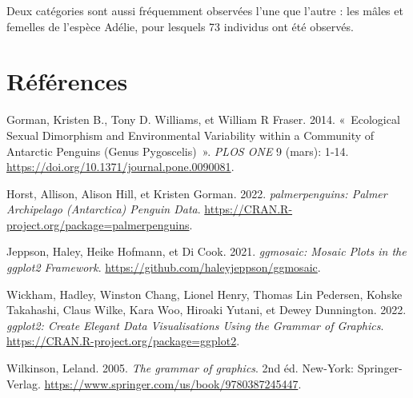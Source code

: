\documentclass[
  letterpaper,
  DIV=11,
  numbers=noendperiod]{scrreprt}
\newlength{\cslhangindent}
\newlength{\cslentryspacingunit} %
\newenvironment{CSLReferences}[2] %
 {%
  \setlength{\parindent}{0pt}
  \ifodd #1
  \let\oldpar\par
  \def\par{\hangindent=\cslhangindent\oldpar}
  \fi
  \setlength{\parskip}{#2\cslentryspacingunit}
 }%
 {}
\begin{document}
Deux catégories sont aussi fréquemment observées l'une que l'autre : les
mâles et femelles de l'espèce Adélie, pour lesquels 73 individus ont été
observés.


\hypertarget{ruxe9fuxe9rences}{%
\chapter*{Références}\label{ruxe9fuxe9rences}}

\hypertarget{refs}{}
\begin{CSLReferences}{1}{0}
\leavevmode{}%
Gorman, Kristen B., Tony D. Williams, et William R Fraser. 2014.
{«~Ecological Sexual Dimorphism and Environmental Variability within a
Community of Antarctic Penguins (Genus Pygoscelis)~»}. \emph{PLOS ONE} 9
(mars): 1‑14. \url{https://doi.org/10.1371/journal.pone.0090081}.

\leavevmode{}%
Horst, Allison, Alison Hill, et Kristen Gorman. 2022.
\emph{palmerpenguins: Palmer Archipelago (Antarctica) Penguin Data}.
\url{https://CRAN.R-project.org/package=palmerpenguins}.

\leavevmode{}%
Jeppson, Haley, Heike Hofmann, et Di Cook. 2021. \emph{ggmosaic: Mosaic
Plots in the ggplot2 Framework}.
\url{https://github.com/haleyjeppson/ggmosaic}.

\leavevmode{}%
Wickham, Hadley, Winston Chang, Lionel Henry, Thomas Lin Pedersen,
Kohske Takahashi, Claus Wilke, Kara Woo, Hiroaki Yutani, et Dewey
Dunnington. 2022. \emph{ggplot2: Create Elegant Data Visualisations
Using the Grammar of Graphics}.
\url{https://CRAN.R-project.org/package=ggplot2}.

\leavevmode{}%
Wilkinson, Leland. 2005. \emph{The grammar of graphics}. 2nd éd.
New-York: Springer-Verlag.
\url{https://www.springer.com/us/book/9780387245447}.

\end{CSLReferences}
\end{document}
